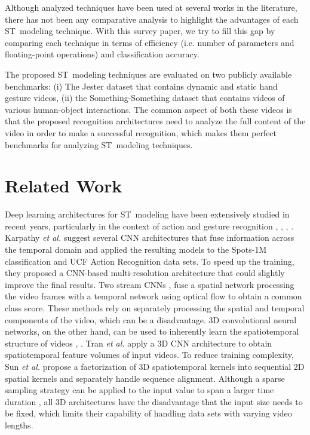 \documentclass[runningheads]{llncs}
\begin{document}
Although analyzed techniques have been used at several works in the literature, there has not been any comparative analysis to highlight the advantages of each ST~modeling technique. With this survey paper, we try to fill this gap by comparing each technique in terms of efficiency (i.e. number of parameters and floating-point operations) and classification accuracy. 

The proposed ST~modeling techniques are evaluated on two publicly available benchmarks: (i) The Jester dataset that contains dynamic and static hand gesture videos, (ii) the Something-Something dataset that contains videos of various human-object interactions. The common aspect of both these videos is that the proposed recognition architectures need to analyze the full content of the video in order to make a successful recognition, which makes them perfect benchmarks for analyzing ST~modeling techniques.

 \section{Related Work}

Deep learning architectures for ST~modeling have been extensively studied in recent years, particularly in the context of action and gesture recognition \cite{Karpathy_undated-pv}, \cite{Simonyan2014-vh}, \cite{Zhou2018-ah}, \cite{Wang2016-gj}. Karpathy \textit{et al.} \cite{Karpathy_undated-pv} suggest several CNN architectures that fuse information across the temporal domain and applied the resulting models to the Spots-1M classification and UCF Action Recognition data sets. To speed up the training, they proposed a CNN-based multi-resolution architecture that could slightly improve the final results. Two stream CNNs \cite{Simonyan2014-vh}, \cite{feichtenhofer2016convolutional} fuse a spatial network processing the video frames with a temporal network using optical flow to obtain a common class score. These methods rely on separately processing the spatial and temporal components of the video, which can be a disadvantage. 3D convolutional neural networks, on the other hand, can be used to inherently learn the spatiotemporal structure of videos \cite{hara2018can}, \cite{kopuklu2019resource}. Tran \textit{et al.} \cite{Tran2015-lf} apply a 3D CNN architecture to obtain spatiotemporal feature volumes of input videos. To reduce training complexity, Sun \textit{et al.} \cite{Sun2015-va} propose a factorization of 3D spatiotemporal kernels into sequential 2D spatial kernels and separately handle sequence alignment. Although a sparse sampling strategy can be applied to the input value to span a larger time duration \cite{kopuklu2018analysis}, all 3D architectures have the disadvantage that the input size needs to be fixed, which limits their capability of handling data sets with varying video lengths. 
\end{document}
